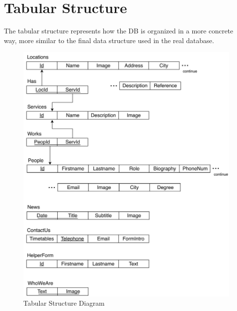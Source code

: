 \section{Tabular Structure}
\par The tabular structure represents how the DB is organized in a more concrete way, more similar to the final data structure used in the real database. 
\begin{figure}[h]
\includegraphics[width=0.945 \textwidth, center]{MainMatter/images/DB.jpg}
\caption{Tabular Structure Diagram}
\label{fig:figure2}
\end{figure}
%
%
